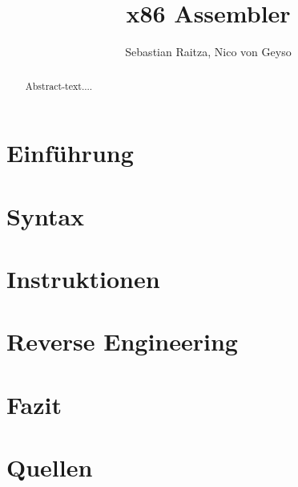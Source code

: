 \documentclass{lni}
\title{x86 Assembler}
\author{Sebastian Raitza, Nico von Geyso}
\begin{document}
\maketitle

\begin{abstract}
Abstract-text....
\end{abstract}

\section{Einführung}



\section{Syntax}

\section{Instruktionen}

\section{Reverse Engineering}

\section{Fazit}

\section{Quellen}
\end{document}
